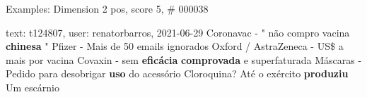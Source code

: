 \begin{frame}{Examples: Dimension 2 pos, score 5, \# 000038}
\footnotesize
\begin{exampleblock}{text: t124807, user: renatorbarros, 2021-06-29}
Coronavac - " não compro vacina \textbf{chinesa} " Pfizer - Mais de 50 emails 
ignorados Oxford / AstraZeneca - US\$ a mais por vacina Covaxin - sem 
\textbf{eficácia} \textbf{comprovada} e superfaturada Máscaras - Pedido para 
desobrigar \textbf{uso} do acessório Cloroquina? Até o exército 
\textbf{produziu} Um escárnio 
\end{exampleblock}
\end{frame}
